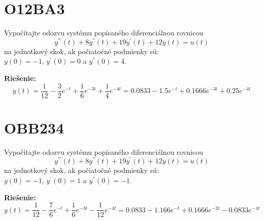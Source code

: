 \documentclass[a4paper, 12pt]{article}
\newenvironment{task}{}{}
\newenvironment{solution}{\noindent\textbf{Riešenie:}}{}
\begin{document}
\section*{O12BA3}
\begin{task}
    Vypočítajte odozvu systému popísaného diferenciálnou rovnicou
    \begin{equation*}
        y^{'''}(t)+8y^{''}(t)+19y^{'}(t)+12y(t)=u(t)
    \end{equation*}
    na jednotkový skok, ak počiatočné podmienky sú: \\
    $y(0)=-1$, $y^{'}(0)=0$ a $y^{''}(0)=4$.
\end{task}

\begin{solution}
    \begin{equation*}
        y(t)=\dfrac{1}{12} - \dfrac{3}{2}e^{-t} + \dfrac{1}{6}e^{-3t} + \dfrac{1}{4}e^{-4t} = 0.0833 -1.5 e^{-t} + 0.1666 e^{-3t} + 0.25 e^{-4t}
    \end{equation*}
\end{solution}


\section*{OBB234}
\begin{task}
    Vypočítajte odozvu systému popísaného diferenciálnou rovnicou
    \begin{equation*}
        y^{'''}(t)+8y^{''}(t)+19y^{'}(t)+12y(t)=u(t)
    \end{equation*}
    na jednotkový skok, ak počiatočné podmienky sú: \\
    $y(0)=-1$, $y^{'}(0)=1$ a $y^{''}(0)=-1$.
\end{task}

\begin{solution}
    \begin{equation*}
        y(t)=\dfrac{1}{12} - \dfrac{7}{6}e^{-t} + \dfrac{1}{6}e^{-3t} - \dfrac{1}{12}e^{-4t} = 0.0833 -1.166 e^{-t} + 0.1666 e^{-3t} - 0.0833 e^{-4t}
    \end{equation*}
\end{solution}
\end{document}
